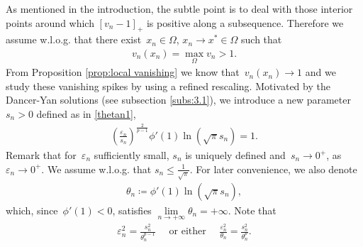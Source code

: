 \documentclass[10pt]{amsart}
\newcommand{\parenthesis}[1]{\left(#1\right)} %
\newcommand{\eps}{\varepsilon}
\renewcommand{\to}{\rightarrow}
\begin{document}
As mentioned in the introduction, the subtle point is to deal with those interior points around which $[v_n-1]_+$ is positive along a subsequence.
Therefore we assume w.l.o.g. that there exist~$x_n\in\Omega$, $x_n\to x^*\in \Omega$ such that
    \begin{align*}
        v_n(x_n)=\max_{\Omega} v_n>1.
    \end{align*}
    From Proposition \ref{prop:local vanishing} we know that~$v_n(x_n)\to 1$ and we study these vanishing spikes by
    using a refined rescaling. Motivated by the Dancer-Yan solutions (see subsection \ref{subs:3.1}),
    we introduce a new parameter~$s_n>0$ defined as in \eqref{thetan1},
    \begin{align*}
        \parenthesis{\frac{\eps_n}{s_n}}^{\frac{2}{p-1}} \phi'(1)\ln(\sqrt{\pi} s_n)=1.
    \end{align*}
    Remark that for~$\eps_n$ sufficiently small, $s_n$ is uniquely defined and~$s_n\to 0^+$, as $\eps_n\to 0^+$.
    We assume w.l.o.g. that $s_n\leq \frac{1}{\sqrt{\pi}}$. For later convenience, we also denote
    \begin{align*}
        \theta_n\coloneqq \phi'(1)\ln(\sqrt{\pi}s_n),
    \end{align*}
    which, since~$\phi'(1)<0$, satisfies $\lim\limits_{n\to+\infty}\theta_n=+\infty$.
    Note that
    \begin{align}\label{2ways}
        \eps_n^2 = \frac{s_n^2}{\theta_n^{p-1}} \quad \mbox{ or either }\quad \frac{\eps_n^2}{\theta_n} = \frac{s_n^2}{\theta_n^{p}}.
    \end{align}
\end{document}
